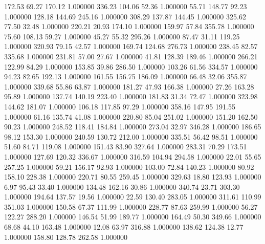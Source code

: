     172.53     69.27    170.12  1.000000
    336.23    104.06     52.36  1.000000
     55.71    148.77     92.23  1.000000
    128.18    144.69    245.16  1.000000
    308.29    137.87    144.45  1.000000
    325.62     77.50     32.48  1.000000
    220.21     20.93    174.10  1.000000
    159.97     57.84    355.78  1.000000
     75.60    108.13     59.27  1.000000
     45.27     55.32    295.26  1.000000
     87.47     31.11    119.25  1.000000
    320.93     79.15     42.57  1.000000
    169.74    124.68    276.73  1.000000
    238.45     82.57    335.68  1.000000
    231.81     57.00     27.67  1.000000
     41.81    128.39    189.46  1.000000
    266.21    122.99     84.29  1.000000
    153.85     39.86    286.50  1.000000
    103.26     61.56    334.57  1.000000
     94.23     82.65    192.13  1.000000
    161.55    156.75    186.09  1.000000
     66.48     32.06    355.87  1.000000
    339.68     55.86     63.87  1.000000
    181.27     47.93    166.38  1.000000
     27.26    163.28     95.89  1.000000
    137.74    140.19    223.40  1.000000
    181.83     31.34     72.47  1.000000
    323.98    144.62    181.07  1.000000
    106.18    117.85     97.29  1.000000
    358.16    147.95    191.55  1.000000
     61.16    135.74     41.08  1.000000
    220.80     85.04    251.02  1.000000
    151.20    162.50     90.23  1.000000
    248.52    118.41    184.84  1.000000
    273.04     32.97    346.28  1.000000
    186.65     98.12    153.30  1.000000
    240.59    130.72    212.00  1.000000
    335.51     56.42     98.51  1.000000
     51.60     84.71    119.08  1.000000
    151.43     83.90    327.64  1.000000
    283.31     70.29    173.51  1.000000
    127.69    120.32    336.67  1.000000
    316.59    104.94    294.58  1.000000
     22.01     55.65    257.25  1.000000
     59.21    156.17     92.93  1.000000
    103.00     72.84    140.23  1.000000
     80.92    158.10    228.38  1.000000
    220.71     80.55    259.45  1.000000
    329.63     18.80    123.93  1.000000
      6.97     95.43     33.40  1.000000
    134.48    162.16     30.86  1.000000
    340.74     23.71    303.30  1.000000
    194.64    137.57     19.56  1.000000
     22.59    130.40    283.05  1.000000
    311.61    110.99    351.03  1.000000
    150.58     67.37    111.99  1.000000
    228.77     87.63    259.99  1.000000
     56.27    122.27    288.20  1.000000
    146.54     51.99    189.77  1.000000
    164.49     50.30    349.66  1.000000
     68.68     44.10    163.48  1.000000
     12.08     63.97    316.88  1.000000
    138.62    124.38     12.77  1.000000
    158.80    128.78    262.58  1.000000
